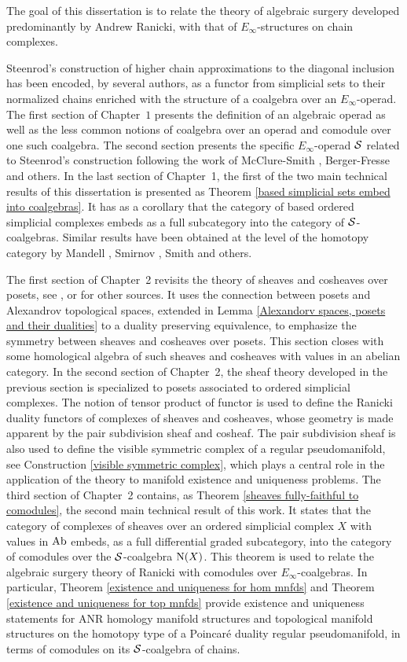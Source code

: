 The goal of this dissertation is to relate the theory of algebraic surgery developed predominantly by Andrew Ranicki, with that of $E_\infty$-structures on chain complexes.

Steenrod's construction of higher chain approximations to the diagonal inclusion has been encoded, by several authors, as a functor from simplicial sets to their normalized chains enriched with the structure of a coalgebra over an $E_\infty$-operad. The first section of Chapter~$1$ presents the definition of an algebraic operad as well as the less common notions of coalgebra over an operad and comodule over one such coalgebra. The second section presents the specific $E_\infty$-operad $\S$ related to Steenrod's construction following the work of McClure-Smith \cite{MS03}, Berger-Fresse \cite{BF04} and others. In the last section of Chapter~1, the first of the two main technical results of this dissertation is presented as Theorem \ref{based simplicial sets embed into coalgebras}. It has as a corollary that the category of based ordered simplicial complexes embeds as a full subcategory into the category of $\S$-coalgebras. Similar results have been obtained at the level of the homotopy category by Mandell \cite{Man06}, Smirnov \cite{Smi98}, Smith \cite{Smi15} and others.

The first section of Chapter~2 revisits the theory of sheaves and cosheaves over posets, see \cite{Cur13}, \cite{she85} or \cite{Lad08} for other sources. It uses the connection between posets and Alexandrov topological spaces, extended in Lemma \ref{Alexandorv spaces, posets and their dualities} to a duality preserving equivalence, to emphasize the symmetry between sheaves and cosheaves over posets. This section closes with some homological algebra of such sheaves and cosheaves with values in an abelian category. In the second section of Chapter~2, the sheaf theory developed in the previous section is specialized to posets associated to ordered simplicial complexes. The notion of tensor product of functor is used to define the Ranicki duality functors of complexes of sheaves and cosheaves, whose geometry is made apparent by the pair subdivision sheaf and cosheaf. The pair subdivision sheaf is also used to define the visible symmetric complex of a regular pseudomanifold, see Construction \ref{visible symmetric complex}, which plays a central role in the application of the theory to manifold existence and uniqueness problems. The third section of Chapter~2 contains, as Theorem \ref{sheaves fully-faithful to comodules}, the second main technical result of this work. It states that the category of complexes of sheaves over an ordered simplicial complex $X$ with values in $\Ab$ embeds, as a full differential graded subcategory, into the category of comodules over the $\S$-coalgebra $\chains(X)$. This theorem is used to relate the algebraic surgery theory of Ranicki with comodules over $E_\infty$-coalgebras. In particular, Theorem \ref{existence and uniqueness for hom mnfds} and Theorem \ref{existence and uniqueness for top mnfds} provide existence and uniqueness statements for ANR homology manifold structures and topological manifold structures on the homotopy type of a Poincar\'e duality regular pseudomanifold, in terms of comodules on its $\S$-coalgebra of chains.